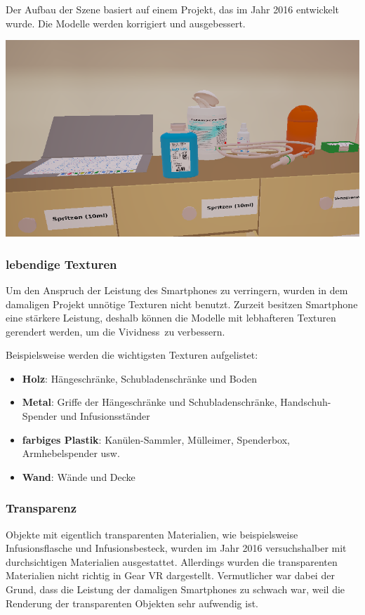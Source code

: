   Der Aufbau der Szene basiert auf einem Projekt, das im Jahr 2016 entwickelt wurde\citep{26}. Die Modelle werden korrigiert und ausgebessert.
  
  \includegraphics[width=\textwidth]{images/WithoutGlass.png}

   \subsubsection{lebendige Texturen}
   
   Um den Anspruch der Leistung des Smartphones zu verringern, wurden in dem damaligen Projekt unnötige Texturen nicht benutzt. Zurzeit besitzen Smartphone eine stärkere Leistung, deshalb können die Modelle mit lebhafteren Texturen gerendert werden, um die \glqq Vividness\grqq\ zu verbessern.
   
   Beispielsweise werden die wichtigsten Texturen aufgelistet:
   \begin{itemize}
       \item \textbf{Holz}: Hängeschränke, Schubladenschränke und Boden
       \item \textbf{Metal}: Griffe der Hängeschränke und Schubladenschränke, Handschuh-Spender und Infusionsständer
       \item \textbf{farbiges Plastik}: Kanülen-Sammler, Mülleimer, Spenderbox, Armhebelspender usw.
       \item \textbf{Wand}: Wände und Decke
   \end{itemize}
   
   \subsubsection{Transparenz}
   Objekte mit eigentlich transparenten Materialien, wie beispielsweise Infusionsflasche und Infusionsbesteck, wurden im Jahr 2016 versuchshalber mit durchsichtigen Materialien ausgestattet. Allerdings wurden die transparenten Materialien nicht richtig in Gear VR dargestellt. Vermutlicher war dabei der Grund, dass die Leistung der damaligen Smartphones zu schwach war, weil die Renderung der transparenten Objekten sehr aufwendig ist.
   
